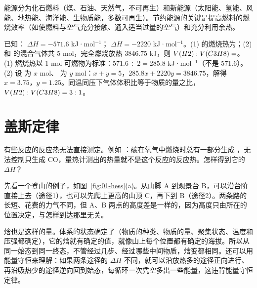 能源分为化石燃料（煤、石油、天然气，不可再生）和新能源（太阳能、氢能、风能、地热能、海洋能、生物质能，多数可再生）。节约能源的关键是提高燃料的燃烧效率（如使燃料与空气充分接触、通入适当过量的空气）和充分利用余热。

\begin{liti}[典型]
已知： $\Delta H=-571.6$ kJ·mol$^{-1}$； $\Delta H=-2220$ kJ·mol$^{-1}$。(1)  的燃烧热为\tk；(2)  和  的混合气体共 5 mol，完全燃烧放热 3846.75 kJ，则 $V(H2):V(C3H8)=$\tk。
\tcblower
\jie (1) 燃烧热以 1 mol 可燃物为标准：$571.6\div2=285.8$ kJ·mol$^{-1}$（不是 571.6）。\\
(2) 设  为 $x$ mol、 为 $y$ mol：$x+y=5$，$285.8x+2220y=3846.75$，解得 $x=3.75$，$y=1.25$。同温同压下气体体积比等于物质的量之比，$V(H2):V(C3H8)=3:1$。
\end{liti}

\section{盖斯定律}

有些反应的反应热无法直接测定。例如 ：碳在氧气中燃烧时总有一部分生成 ，无法控制只生成 CO，量热计测出的热量就不是这个反应的反应热。怎样得到它的 $\Delta H$？

先看一个登山的例子，如图~\ref{fig:01-hess}(a)。从山脚 A 到观景台 B，可以沿台阶直接上去（途径1），也可以先爬上更高的山顶 C，再下到 B（途径2）。两条路的长短、花费的力气不同，但 A、B 两点的高度差是一样的，因为高度只由所在的位置决定，与怎样到达那里无关。

焓也是这样的量。体系的状态确定了（物质的种类、物质的量、聚集状态、温度和压强都确定），它的焓就有确定的值，就像山上每个位置都有确定的海拔。所以从同一始态到同一终态，不管经过几步、经过哪些中间物质，焓变都相同。还可以用能量守恒来理解：如果两条途径的 $\Delta H$ 不同，就可以沿放热多的途径正向进行、再沿吸热少的途径逆向回到始态，每循环一次凭空多出一些能量，这违背能量守恒定律。

